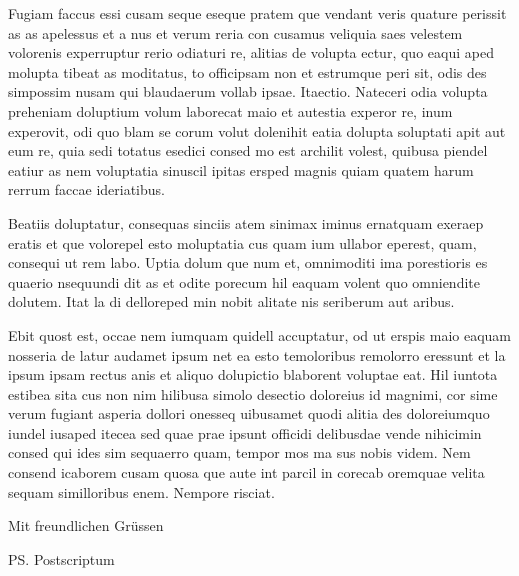 \documentclass[english]{ethbrief3}
\begin{document}
    Fugiam faccus essi cusam seque eseque pratem que vendant veris quature perissit as as apelessus et a nus et verum reria con cusamus veliquia saes velestem volorenis experruptur rerio odiaturi re, alitias de volupta ectur, quo eaqui aped molupta tibeat as moditatus, to officipsam non et estrumque peri sit, odis des simpossim nusam qui blaudaerum vollab ipsae. Itaectio. Nateceri odia volupta preheniam doluptium volum laborecat maio et autestia experor re, inum experovit, odi quo blam se corum volut dolenihit eatia dolupta soluptati apit aut eum re, quia sedi totatus esedici consed mo est archilit volest, quibusa piendel eatiur as nem voluptatia sinuscil ipitas ersped magnis quiam quatem harum rerrum faccae ideriatibus.

    Beatiis doluptatur, consequas sinciis atem sinimax iminus ernatquam exeraep eratis et que volorepel esto moluptatia cus quam ium ullabor eperest, quam, consequi ut rem labo. Uptia dolum que num et, omnimoditi ima porestioris es quaerio nsequundi dit as et odite porecum hil eaquam volent quo omniendite dolutem. Itat la di delloreped min nobit alitate nis seriberum aut aribus.

    Ebit quost est, occae nem iumquam quidell accuptatur, od ut erspis maio eaquam nosseria de latur audamet ipsum net ea esto temoloribus remolorro eressunt et la ipsum ipsam rectus anis et aliquo dolupictio blaborent voluptae eat. Hil iuntota estibea sita cus non nim hilibusa simolo desectio doloreius id magnimi, cor sime verum fugiant asperia dollori onesseq uibusamet quodi alitia des doloreiumquo iundel iusaped itecea sed quae prae ipsunt officidi delibusdae vende nihicimin consed qui ides sim sequaerro quam, tempor mos ma sus nobis videm. Nem consend icaborem cusam quosa que aute int parcil in corecab oremquae velita sequam similloribus enem. Nempore risciat.

   \closing{Mit freundlichen Gr\"ussen}



    \ps{Postscriptum}


\end{document}
